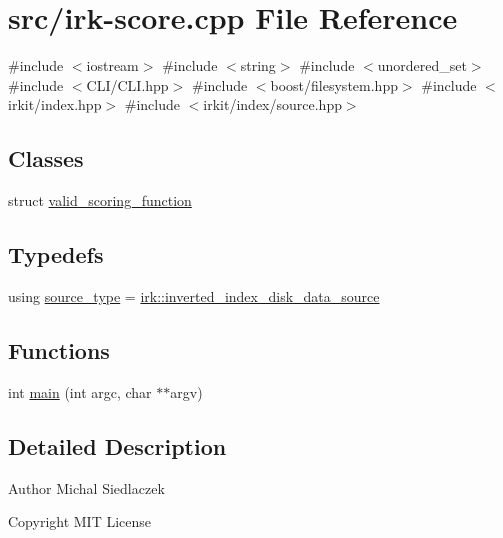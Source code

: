 \hypertarget{irk-score_8cpp}{}\section{src/irk-\/score.cpp File Reference}
\label{irk-score_8cpp}
{\ttfamily \#include $<$iostream$>$}\newline
{\ttfamily \#include $<$string$>$}\newline
{\ttfamily \#include $<$unordered\+\_\+set$>$}\newline
{\ttfamily \#include $<$C\+L\+I/\+C\+L\+I.\+hpp$>$}\newline
{\ttfamily \#include $<$boost/filesystem.\+hpp$>$}\newline
{\ttfamily \#include $<$irkit/index.\+hpp$>$}\newline
{\ttfamily \#include $<$irkit/index/source.\+hpp$>$}\newline
\subsection*{Classes}
\begin{DoxyCompactItemize}
\item 
struct \mbox{\hyperlink{structvalid__scoring__function}{valid\+\_\+scoring\+\_\+function}}
\end{DoxyCompactItemize}
\subsection*{Typedefs}
\begin{DoxyCompactItemize}
\item 
using \mbox{\hyperlink{irk-score_8cpp_a73f57f67fb1e33bdbfd80bfba2fc9ffe}{source\+\_\+type}} = \mbox{\hyperlink{classirk_1_1inverted__index__disk__data__source}{irk\+::inverted\+\_\+index\+\_\+disk\+\_\+data\+\_\+source}}
\end{DoxyCompactItemize}
\subsection*{Functions}
\begin{DoxyCompactItemize}
\item 
int \mbox{\hyperlink{irk-score_8cpp_a3c04138a5bfe5d72780bb7e82a18e627}{main}} (int argc, char $\ast$$\ast$argv)
\end{DoxyCompactItemize}


\subsection{Detailed Description}
\begin{DoxyAuthor}{Author}
Michal Siedlaczek 
\end{DoxyAuthor}
\begin{DoxyCopyright}{Copyright}
M\+IT License 
\end{DoxyCopyright}


